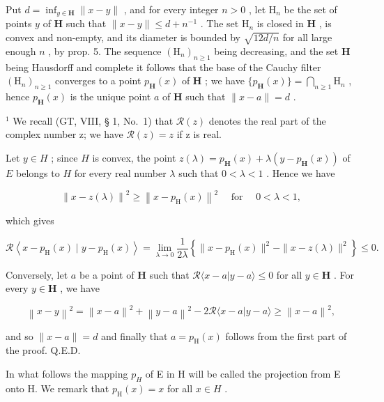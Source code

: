 Put \(d = \inf_{y \in \mathbf{H}} \| x - y \|\) , and for every integer \(n > 0\) , let \(\mathrm{H}_n\) be the set of points \(y\) of \(\mathbf{H}\) such that \(\| x - y \| \leqslant d + n^{-1}\) . The set \(\mathrm{H}_n\) is closed in \(\mathbf{H}\) , is convex and non-empty, and its diameter is bounded by \(\sqrt{12d / n}\) for all large enough \(n\) , by prop. 5. The sequence \((\mathrm{H}_n)_{n \geqslant 1}\) being decreasing, and the set \(\mathbf{H}\) being Hausdorff and complete it follows that the base of the Cauchy filter \((\mathrm{H}_n)_{n \geqslant 1}\) converges to a point \(p_{\mathbf{H}}(x)\) of \(\mathbf{H}\) ; we have \(\{p_{\mathbf{H}}(x)\} = \bigcap_{n \geqslant 1} \mathrm{H}_n\) , hence \(p_{\mathbf{H}}(x)\) is the unique point \(a\) of \(\mathbf{H}\) such that \(\| x - a \| = d\) .

\(^{1}\) We recall (GT, VIII, § 1, No.~1) that \(\mathcal{R}(z)\) denotes the real part of the complex number z; we have \(\mathcal{R}(z)=z\) if z is real.

Let \(y \in H\) ; since \(H\) is convex, the point \(z(\lambda) = p_{\mathbf{H}}(x) + \lambda(y - p_{\mathbf{H}}(x))\) of \(E\) belongs to \(H\) for every real number \(\lambda\) such that \(0 < \lambda < 1\) . Hence we have

\[
\left\| x - z (\lambda) \right\| ^ {2} \geqslant \left\| x - p _ {\mathrm{H}} (x) \right\| ^ {2} \quad \text { for } \quad 0 <   \lambda <   1,
\]

which gives

\[
\mathcal {R} \left\langle x - p _ {\mathrm{H}} (x) \mid y - p _ {\mathrm{H}} (x) \right\rangle = \lim _ {\lambda \rightarrow 0} \frac {1}{2 \lambda} \left\{\| x - p _ {\mathrm{H}} (x) \| ^ {2} - \| x - z (\lambda) \| ^ {2} \right\} \leqslant 0.
\]

Conversely, let \(a\) be a point of \(\mathbf{H}\) such that \(\mathcal{R}\langle x - a|y - a\rangle \leqslant 0\) for all \(y\in \mathbf{H}\) . For every \(y\in \mathbf{H}\) , we have

\[
\left\| x - y \right\| ^ {2} = \left\| x - a \right\| ^ {2} + \left\| y - a \right\| ^ {2} - 2 \mathcal {R} \langle x - a | y - a \rangle \geqslant \left\| x - a \right\| ^ {2},
\]

and so \(\| x - a\| = d\) and finally that \(a = p_{\mathrm{H}}(x)\) follows from the first part of the proof. Q.E.D.

In what follows the mapping \(p_{H}\) of E in H will be called the projection from E onto H. We remark that \(p_{\mathrm{H}}(x)=x\) for all \(x\in H\) .

